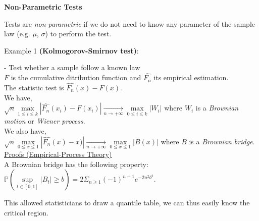 {\fontsize{12pt}{22pt} \textbf{Non-Parametric Tests}\par}

\vspace{5mm}

Tests are \textit{non-parametric} if we do not need to know any parameter of the sample law (e.g. $\mu$, $\sigma$) to perform the test.

\vspace{5mm}

Example 1 \textbf{(Kolmogorov-Smirnov test)}: 

\vspace{5mm}

- Test whether a sample follow a known law \\

$F$ is the cumulative ditribution function and $\widehat{F_n}$ its empirical estimation. \\

The statistic test is $\widehat{F_n}(x) - F(x)$. \\

We have, \\

$\sqrt{n} \underset{1 \leq i \leq k}{\operatorname{max}}|\widehat{F_n}(x_i) - F(x_i)| \underset{n \rightarrow + \infty}{\rightarrow} \underset{0 \leq i \leq k}{\operatorname{max}}|W_i|$ where $W_i$ is a \textit{Brownian motion} or \textit{Wiener process}.\\

We also have, \\

$\sqrt{n} \underset{0 \leq x \leq 1}{\operatorname{max}}|\widehat{F_n}(x) -x)| \underset{n \rightarrow + \infty}{\rightarrow} \underset{0 \leq x \leq 1}{\operatorname{max}}|B(x)|$ where $B$ is a \textit{Brownian bridge}.\\

\href{http://www.math.utah.edu/~davar/ps-pdf-files/Kolmogorov-Smirnov.pdf}{Proofs (Empirical-Process Theory)} \\

A Brownian bridge has the following property: \\

$\mathbb{P}(\underset{t \in [0,1]}{\operatorname{sup}}|B_t| \geq b) = 2 \Sigma_{n \geq 1}(-1)^{n-1}e^{-2n^2b^2}$.

This allowed statisticians to draw a quantile table, we can thus easily know the critical region.

\vspace{5mm}


